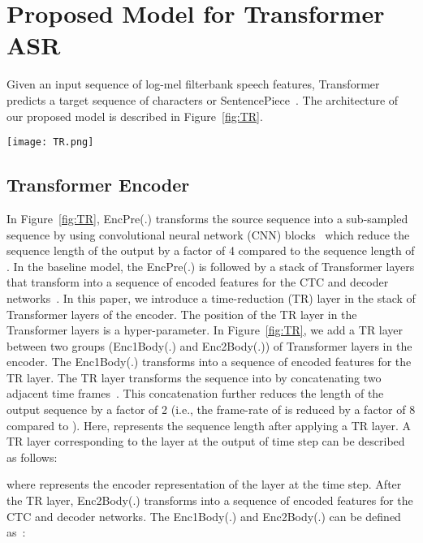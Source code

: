 \documentclass{article}
\begin{document}
\section{Proposed Model for Transformer ASR}
Given an input sequence  of log-mel filterbank speech features, Transformer predicts a target sequence  of characters or SentencePiece~\citep{kudo2018sentencepiece}. The architecture of our proposed model is described in Figure~\ref{fig:TR}.

\begin{figure*}[ht]
\vskip 0.2in
\begin{center}
\centerline{\texttt{[image: TR.png]}}
\caption{Proposed Transformer ASR with time-reduction layer}
\label{fig:TR}
\end{center}
\vskip -0.2in
\end{figure*}

\subsection{Transformer Encoder}
In Figure~\ref{fig:TR}, EncPre(.) transforms the source sequence  into a sub-sampled sequence  by using convolutional neural network (CNN) blocks~\citep{karita2019asru,moritz2020,wang2020a} which reduce the sequence length of the output  by a factor of 4 compared to the sequence length of . In the baseline model, the EncPre(.) is followed by a stack of Transformer layers that transform  into a sequence of encoded features  for the CTC and decoder networks~\citep{karita2019asru}. In this paper, we introduce a time-reduction (TR) layer in the stack of Transformer layers of the encoder. The position of the TR layer in the Transformer layers is a  hyper-parameter. In Figure~\ref{fig:TR}, we add a TR layer between two groups (Enc1Body(.) and Enc2Body(.)) of Transformer layers in the encoder.
The Enc1Body(.) transforms  into a sequence of encoded features  for the TR layer. The TR layer transforms the sequence  into  by concatenating two adjacent time frames~\citep{chan2016listen}. This concatenation further reduces the length of the output sequence  by a factor of 2 (i.e., the frame-rate of  is reduced by a factor of 8 compared to ). 
Here,  represents the sequence length after applying a TR layer. A TR layer corresponding to the  layer at the output of  time step can be described as follows:
 
where  represents the encoder representation of the  layer at the  time step. After the TR layer, Enc2Body(.) transforms  into a sequence of encoded features  for the CTC and decoder networks. The Enc1Body(.) and Enc2Body(.) can be defined as~\citep{karita2019asru}:
\end{document}
